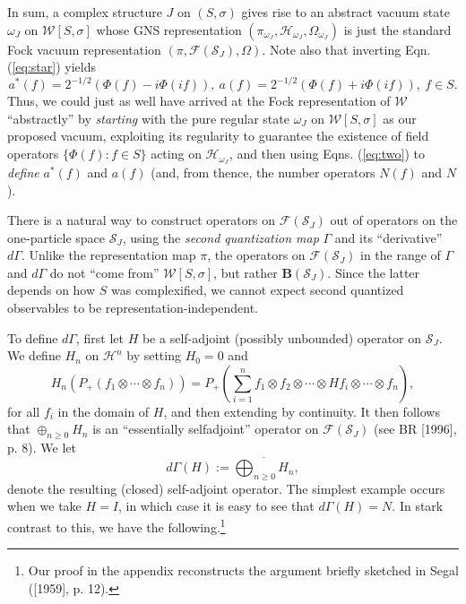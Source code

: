 \documentclass[12pt]{article}
\theoremstyle{remark}
\theoremstyle{definition}
\newcommand{\alg}[1]{\mathcal{#1}}
\newcommand{\hil}[1]{\mathcal{#1}}
\begin{document}
In sum, a complex structure $J$ on $(S,\sigma )$ gives rise to an
abstract vacuum state $\omega _{J}$ on $\alg{W}[S,\sigma ]$ whose GNS
representation $(\pi _{\omega_{J}},\hil{H}_{\omega_{J}},\Omega
_{\omega_{J}})$ is just the standard Fock vacuum representation
$(\pi,\hil{F}(\hil{S}_{J}),\Omega)$.  Note also that inverting Eqn.
(\ref{eq:star}) yields
\begin{equation} \label{eq:two}
  a^{*}(f)= 2^{-1/2}(\Phi (f)-i\Phi (if)),\ a(f)= 2^{-1/2}(\Phi (f)+i\Phi 
  (if)),\ f\in S.
  \end{equation}
  Thus, we could just as well have arrived at the Fock representation of $\alg{W}$ 
  ``abstractly'' by \emph{starting} with the pure regular state $\omega 
  _{J}$ on $\alg{W}[S,\sigma]$ as our proposed vacuum,  
  exploiting its regularity
  to guarantee the existence of field operators $\{\Phi (f):f\in S\}$ 
  acting on 
  $\hil{H}_{\omega_{J}}$, and then using Eqns. (\ref{eq:two}) 
  to \emph{define} $a^{*}(f)$ and 
  $a(f)$ (and, from thence, the number operators $N(f)$ and $N$).
  
 There is a natural way to construct operators on
$\hil{F}(\hil{S}_{J})$ out of operators on the 
one-particle space $\hil{S}_{J}$, using the \emph{second 
quantization map} $\Gamma$ and its ``derivative'' $d\Gamma$.  Unlike the 
representation map $\pi$, 
the operators on $\hil{F}(\hil{S}_{J})$ in the range of $\Gamma$ and 
$d\Gamma$ do not ``come from'' 
$\alg{W}[S,\sigma]$, but rather $\mathbf{B}(\hil{S}_{J})$.  Since the latter 
depends on 
how $S$ was complexified, we cannot expect second quantized observables 
to be
representation-independent.   

To define $d\Gamma$, first let
$H$ be a self-adjoint (possibly unbounded) operator on $\hil{S}_{J}$.
We define $H_{n}$ on $\hil{H}^{n}$ by setting $H_{0}=0$ and
\begin{equation}
H_{n}(P_{+}(f_{1}\otimes \cdots \otimes f_{n}))=P_{+}\left( \sum
  _{i=1}^{n} f_{1}\otimes f_{2}\otimes \cdots \otimes Hf_{i} \otimes
  \cdots \otimes f_{n}\right) ,\end{equation}
for all $f_{i}$ in the domain of $H$, and then extending by
  continuity.  It then follows that $\oplus _{n\geq 0}H_{n}$ is an
  ``essentially selfadjoint'' operator on $\hil{F}(\hil{S}_{J})$ (see
  BR [1996], p. 8).  We let \begin{equation}
d\Gamma (H):=\overline{ \bigoplus _{n\geq 0}H_{n} } ,\end{equation}
denote the resulting (closed) self-adjoint operator.  The simplest 
example occurs when we take $H=I$, in which case it is easy to see 
that $d\Gamma (H)=N$.  
In stark contrast to this, we have the following.\footnote{Our 
proof in the appendix reconstructs the argument briefly sketched in Segal ([1959], 
p. 12).} 
\end{document}
